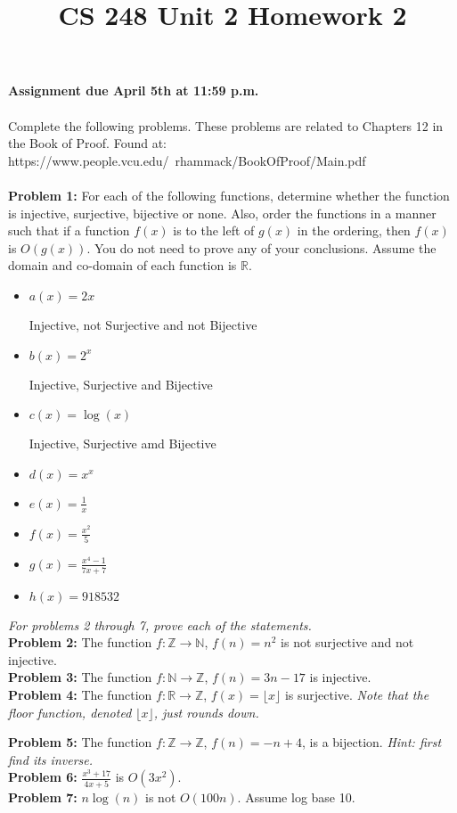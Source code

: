 \documentclass[12pt]{article}
\title{CS 248 Unit 2 Homework 2}
\def\R{\mathbb R} %
\def\Z{\mathbb Z}
\def\N{\mathbb N}
\begin{document}
\textbf{Assignment due April 5th at 11:59 p.m. \\ \\
}Complete the following problems. These problems are related to Chapters 12 in the Book of Proof. Found at: \\ https://www.people.vcu.edu/~rhammack/BookOfProof/Main.pdf \\ \\

{\bf Problem 1:} For each of the following functions, determine whether the function is injective, surjective, bijective or none. Also, order the functions in a manner such that if a function $f(x)$ is to the left of $g(x)$ in the ordering, then $f(x)$ is $O(g(x)).$ You do not need to prove any of your conclusions. Assume the domain and co-domain of each function is $\R$.
\begin{itemize}
    \item $a(x) = 2x$
    
    Injective, not Surjective and not Bijective

    \item $b(x) = 2^x$
    
    Injective, Surjective and Bijective

    \item $c(x) = \log(x)$
    
    Injective, Surjective amd Bijective

    \item $d(x) = x^x$
    \item $e(x) = \frac{1}{x}$
    \item $f(x) = \frac{x^2}{5}$
    \item $g(x) = \frac{x^4-1}{7x+7}$
    \item $h(x) = 918532$
\end{itemize} 

\textit{For problems 2 through 7, prove each of the statements.} \\ 

{\bf Problem 2:} The function $f:\Z \rightarrow \N$, $f(n)= n^2$ is not surjective and not injective.\\

{\bf Problem 3:} The function $f:\N \rightarrow \Z$, $f(n)= 3n-17$ is injective.\\

{\bf Problem 4:} The function $f:\R \rightarrow \Z$, $f(x)= \lfloor x \rfloor$ is surjective. \textit{Note that the floor function, denoted $\lfloor x \rfloor$, just rounds down. \\}

{\bf Problem 5:} The function $f:\Z \rightarrow \Z$, $f(n)=-n + 4$, is a bijection. \textit{Hint: first find its inverse.} \\

{\bf Problem 6:} $\frac{x^3+17}{4x+5}$ is $O(3x^2)$. \\

{\bf Problem 7:} $n \log(n)$ is not $O(100 n)$. Assume log base 10.\\
\end{document}
